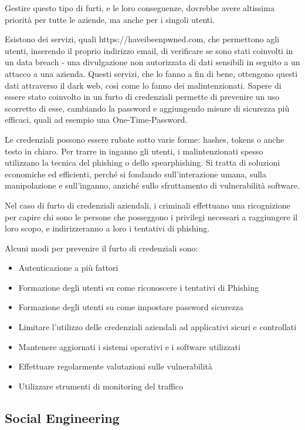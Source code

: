 Gestire questo tipo di furti, e le loro conseguenze, dovrebbe avere altissima priorità per tutte le aziende, ma anche per i singoli utenti.

Esistono dei servizi, quali https://haveibeenpwned.com, che permettono agli utenti, inserendo il proprio indirizzo email, di verificare se sono stati coinvolti in un data breach - una divulgazione non autorizzata di dati sensibili in seguito a un attacco a una azienda. Questi servizi, che lo fanno a fin di bene, ottengono questi dati attraverso il dark web, così come lo fanno dei malintenzionati. Sapere di essere stato coinvolto in un furto di credenziali permette di prevenire un uso scorretto di esse, cambiando la password e aggiungendo misure di sicurezza più efficaci, quali ad esempio una One-Time-Password.

Le credenziali possono essere rubate sotto varie forme: hashes, tokens o anche testo in chiaro. Per trarre in inganno gli utenti, i malintenzionati spesso utilizzano la tecnica del phishing o dello spearphishing. Si tratta di soluzioni economiche ed efficienti, perché si fondando sull'interazione umana, sulla manipolazione e sull'inganno, anziché sullo sfruttamento di vulnerabilità software.

Nel caso di furto di credenziali aziendali, i criminali effettuano una ricognizione per capire chi sono le persone che posseggono i privilegi necessari a raggiungere il loro scopo, e indirizzeranno a loro i tentativi di phishing.

Alcuni modi per prevenire il furto di credenziali sono:
\begin{itemize}
    \item Autenticazione a più fattori
    \item Formazione degli utenti su come riconoscere i tentativi di Phishing
    \item Formazione degli utenti su come impostare password sicurezza
    \item Limitare l'utilizzo delle credenziali aziendali ad applicativi sicuri e controllati
    \item Mantenere aggiornati i sistemi operativi e i software utilizzati
    \item Effettuare regolarmente valutazioni sulle vulnerabilità
    \item Utilizzare strumenti di monitoring del traffico
\end{itemize}

\subsection{Social Engineering}

